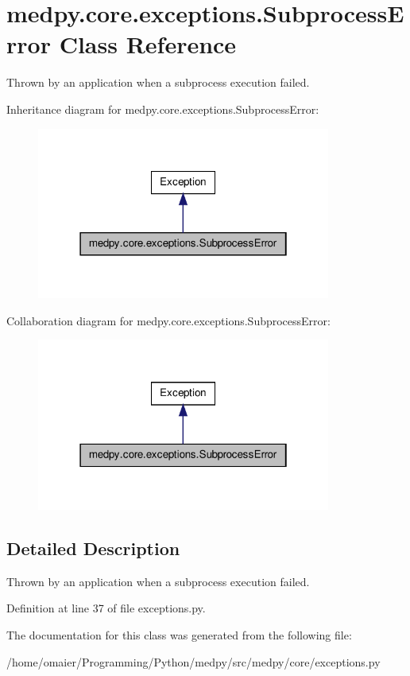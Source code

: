 \hypertarget{classmedpy_1_1core_1_1exceptions_1_1SubprocessError}{
\section{medpy.core.exceptions.SubprocessError Class Reference}
\label{classmedpy_1_1core_1_1exceptions_1_1SubprocessError}
}


Thrown by an application when a subprocess execution failed.  




Inheritance diagram for medpy.core.exceptions.SubprocessError:\nopagebreak
\begin{figure}[H]
\begin{center}
\leavevmode
\includegraphics[width=274pt]{classmedpy_1_1core_1_1exceptions_1_1SubprocessError__inherit__graph}
\end{center}
\end{figure}


Collaboration diagram for medpy.core.exceptions.SubprocessError:\nopagebreak
\begin{figure}[H]
\begin{center}
\leavevmode
\includegraphics[width=274pt]{classmedpy_1_1core_1_1exceptions_1_1SubprocessError__coll__graph}
\end{center}
\end{figure}


\subsection{Detailed Description}
Thrown by an application when a subprocess execution failed. 

Definition at line 37 of file exceptions.py.



The documentation for this class was generated from the following file:\begin{DoxyCompactItemize}
\item 
/home/omaier/Programming/Python/medpy/src/medpy/core/exceptions.py\end{DoxyCompactItemize}
